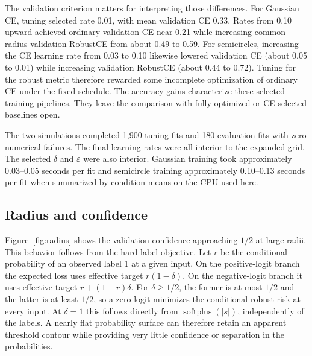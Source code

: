 \documentclass[11pt,a4paper]{article}
\begin{document}
The validation criterion matters for interpreting those differences. For
Gaussian CE, tuning selected rate 0.01, with mean validation CE 0.33.
Rates from 0.10 upward achieved ordinary validation CE near 0.21 while
increasing common-radius validation RobustCE from about 0.49 to 0.59.
For semicircles, increasing the CE learning rate from 0.03 to 0.10 likewise
lowered validation CE (about 0.05 to 0.01) while increasing validation RobustCE
(about 0.44 to 0.72). Tuning for the robust metric therefore rewarded some
incomplete optimization of ordinary CE under the fixed schedule. The
accuracy gains characterize these selected training pipelines. They leave
the comparison with fully optimized or CE-selected baselines open.

The two simulations completed 1,900 tuning fits and 180 evaluation fits
with zero numerical failures. The final learning rates were all interior
to the expanded grid. The selected $\delta$ and $\varepsilon$ were also
interior. Gaussian training took approximately 0.03--0.05 seconds per fit
and semicircle training approximately 0.10--0.13 seconds per fit when
summarized by condition means on the CPU used here.

\subsection{Radius and confidence}
Figure~\ref{fig:radius} shows the validation confidence approaching $1/2$
at large radii. This behavior follows from the hard-label objective.
Let $r$ be the conditional probability of an observed label 1 at a given
input. On the positive-logit branch the expected loss uses effective target
$r(1-\delta)$. On the negative-logit branch it uses effective target
$r+(1-r)\delta$. For $\delta\geq1/2$, the former is at most $1/2$ and the
latter is at least $1/2$, so a zero logit minimizes the conditional robust
risk at every input. At $\delta=1$ this follows directly from
$\operatorname{softplus}(|s|)$, independently of the labels. A nearly flat
probability surface can therefore retain an apparent threshold contour
while providing very little confidence or separation in the probabilities.
\end{document}
